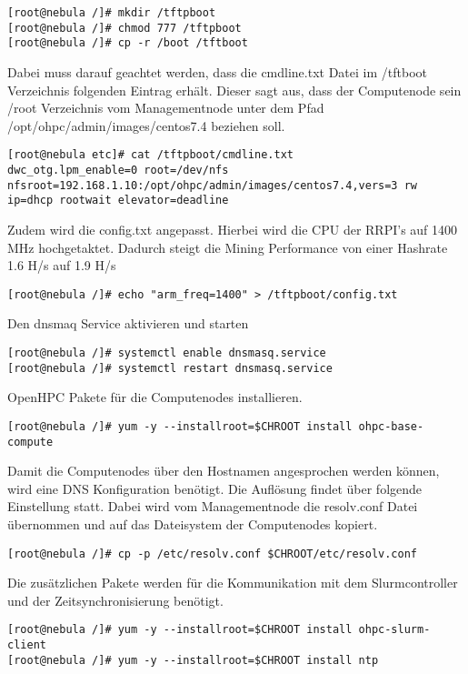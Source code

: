 \begin{lstlisting}
[root@nebula /]# mkdir /tftpboot
[root@nebula /]# chmod 777 /tftpboot
[root@nebula /]# cp -r /boot /tftboot
\end{lstlisting}

Dabei muss darauf geachtet werden, dass die cmdline.txt Datei im /tftboot Verzeichnis folgenden Eintrag erhält. Dieser sagt aus, dass der Computenode sein /root Verzeichnis vom Managementnode unter dem Pfad /opt/ohpc/admin/images/centos7.4 beziehen soll.

\begin{lstlisting}
[root@nebula etc]# cat /tftpboot/cmdline.txt
dwc_otg.lpm_enable=0 root=/dev/nfs nfsroot=192.168.1.10:/opt/ohpc/admin/images/centos7.4,vers=3 rw ip=dhcp rootwait elevator=deadline
\end{lstlisting}

Zudem wird die config.txt angepasst. Hierbei wird die CPU der RRPI's auf 1400 MHz hochgetaktet. Dadurch steigt die Mining Performance von einer Hashrate 1.6 H/s auf 1.9 H/s

\begin{lstlisting}
[root@nebula /]# echo "arm_freq=1400" > /tftpboot/config.txt
\end{lstlisting}


Den dnsmaq Service aktivieren und starten
\begin{lstlisting}
[root@nebula /]# systemctl enable dnsmasq.service
[root@nebula /]# systemctl restart dnsmasq.service
\end{lstlisting}

OpenHPC Pakete für die Computenodes installieren.
\begin{lstlisting}
[root@nebula /]# yum -y --installroot=$CHROOT install ohpc-base-compute
\end{lstlisting}

Damit die Computenodes über den Hostnamen angesprochen werden können, wird eine DNS Konfiguration benötigt. Die Auflösung findet über folgende Einstellung statt. Dabei wird vom Managementnode die resolv.conf Datei übernommen und auf das Dateisystem der Computenodes kopiert.
\begin{lstlisting}
[root@nebula /]# cp -p /etc/resolv.conf $CHROOT/etc/resolv.conf
\end{lstlisting}

Die zusätzlichen Pakete werden für die Kommunikation mit dem Slurmcontroller und der Zeitsynchronisierung benötigt.

\begin{lstlisting}
[root@nebula /]# yum -y --installroot=$CHROOT install ohpc-slurm-client
[root@nebula /]# yum -y --installroot=$CHROOT install ntp
\end{lstlisting}

